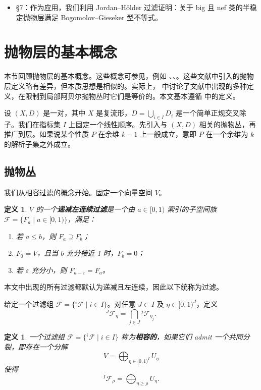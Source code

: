 \documentclass[12pt,a4paper]{article}
\newtheorem{definition}[theorem]{定义}
\begin{document}
\begin{itemize}
\item \S7：作为应用，我们利用 Jordan--H\"older 过滤证明：关于 big 且 nef 类的半稳定抛物层满足 Bogomolov--Gieseker 型不等式。
\end{itemize}

\section{抛物层的基本概念}

本节回顾抛物层的基本概念。这些概念可参见，例如 \cite[Chapter 3]{MochizukiBook}、\cite[Section 2]{IyerSimpson}、\cite[Section 1]{MaruyamaYokogawa}。这些文献中引入的抛物层定义略有差异，但本质思想是相似的。实际上，\cite{IyerSimpson} 中讨论了文献中出现的多种定义，在限制到局部阿贝尔抛物丛时它们是等价的。本文基本遵循 \cite{MochizukiBook} 中的定义。

设 \((X,D)\) 是一对，其中 \(X\) 是复流形，\(D=\bigcup_{i\in I}D_i\) 是一个简单正规交叉除子。我们在指标集 \(I\) 上固定一个线性顺序。先引入与 \((X,D)\) 相关的抛物丛，再推广到层。如果说某个性质 \(P\) 在余维 \(k-1\) 上一般成立，意即 \(P\) 在一个余维为 \(k\) 的解析子集之外成立。

\subsection{抛物丛}

我们从相容过滤的概念开始。固定一个向量空间 \(V\)。

\begin{definition}
\(V\) 的一个\textbf{递减左连续过滤}是一个由 \(a\in[0,1)\) 索引的子空间族 \(\mathcal F=\{F_a\mid a\in[0,1)\}\)，满足：
\begin{enumerate}[label=\arabic*.]
\item 若 \(a\le b\)，则 \(F_a\supseteq F_b\)；
\item \(F_0=V\)，且当 \(b\) 充分接近 1 时，\(F_b=0\)；
\item 若 \(\varepsilon\) 充分小，则 \(F_{a-\varepsilon}=F_a\)。
\end{enumerate}
\end{definition}

本文中出现的所有过滤都默认为递减且左连续，因此以下统称为过滤。

给定一个过滤组 \(\mathcal F=\{{}^i\mathcal F\mid i\in I\}\)。对任意 \(J\subset I\) 及 \(\eta\in[0,1)^J\)，定义
\[
{}^J\mathcal F_\eta=\bigcap_{j\in J} {}^j\mathcal F_{\eta_j}.
\]

\begin{definition}
一个过滤组 \(\mathcal F=\{{}^i\mathcal F\mid i\in I\}\) 称为\textbf{相容的}，如果它们 admit 一个共同分裂，即存在一个分解
\[
V=\bigoplus_{\eta\in[0,1)^I}U_\eta
\]
使得
\[
{}^I\mathcal F_\rho=\bigoplus_{\eta\ge \rho} U_\eta.
\]
\end{definition}
\end{document}
